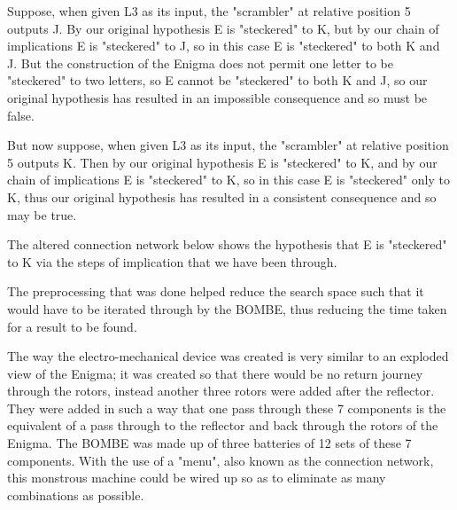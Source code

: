 \documentclass[12pt,a4paper]{article}
\begin{document}
Suppose, when given L3 as its input, the "scrambler" at relative position 5 outputs J. By our original hypothesis E is "steckered" to K, but by our chain of implications E is "steckered" to J, so in this case E is "steckered" to both K and J. But the construction of the Enigma does not permit one letter to be "steckered" to two letters, so E cannot be "steckered" to both K and J, so our original hypothesis has resulted in an impossible consequence and so must be false.

But now suppose, when given L3 as its input, the "scrambler" at relative position 5 outputs K. Then by our original hypothesis E is "steckered" to K, and by our chain of implications E is "steckered" to K, so in this case E is "steckered" only to K, thus our original hypothesis has resulted in a consistent consequence and so may be true.

The altered connection network below shows the hypothesis that E is "steckered" to K via the steps of implication that we have been through.

The preprocessing that was done helped reduce the search space such that it would have to be iterated through by the BOMBE, thus reducing the time taken for a result to be found.

The way the electro-mechanical device was created is very similar to an exploded view of the Enigma; it was created so that there would be no return journey through the rotors, instead another three rotors were added after the reflector. They were added in such a way that one pass through these 7 components is the equivalent of a pass through to the reflector and back through the rotors of the Enigma. The BOMBE was made up of three batteries of 12 sets of these 7 components. With the use of a "menu", also known as the connection network, this monstrous machine could be wired up so as to eliminate as many combinations as possible.\\
\end{document}
